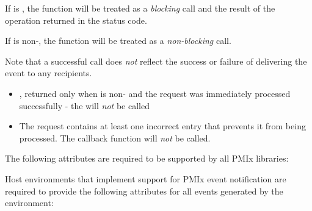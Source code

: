\begin{arglist}
\end{arglist}

If  is , the function will be treated as a \emph{blocking} call and the result of the operation returned in the status code.

If  is non-, the function will be treated as a \emph{non-blocking} call.

\returnsimplenb
Note that a successful call does \textit{not} reflect the success or failure of delivering the event to any recipients.

\returnstart
\begin{itemize}
\item {}, returned only when  is non- and the request was immediately processed successfully - the  will \textit{not} be called
\item {} The request contains at least one incorrect entry that prevents it from being processed. The callback function will \textit{not} be called.
\end{itemize}
\returnend

\reqattrstart
The following attributes are required to be supported by all \ac{PMIx} libraries:


\divider

Host environments that implement support for \ac{PMIx} event notification are required to provide the following attributes for all events generated by the environment:

